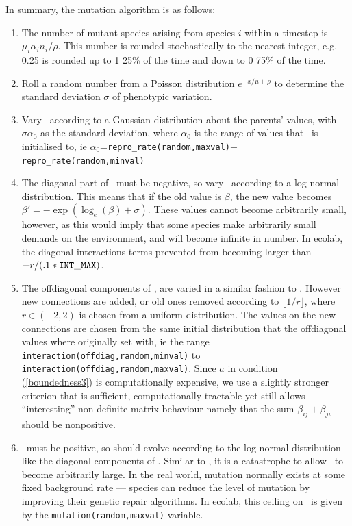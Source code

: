 In summary, the mutation algorithm is as follows:
\begin{enumerate}
\item The number of mutant species arising from species $i$ within a
timestep is $\mu_i\alpha_in_i/\rho$. This number is rounded
stochastically to the nearest integer, e.g. 0.25 is rounded up to 1
25\% of the time and down to 0 75\% of the time.

\item Roll a random number from a Poisson distribution
$e^{-x/\mu+\rho}$ to determine the standard deviation $\sigma$ of phenotypic
variation. 

\item Vary \br\ according to a Gaussian distribution about the
parents' values, with $\sigma\alpha_0$ as the standard deviation,
where $\alpha_0$ is the range of values that \br\ is initialised
to, ie $\alpha_0$=\verb|repro_rate(random,maxval)|$-$\verb|repro_rate(random,minval)|

\item The diagonal part of \bbeta\ must be negative, so vary \bbeta\
according to a log-normal distribution. This means that if the old
value is $\beta$, the new value becomes
$\beta'=-\exp(\log_e(\beta)+\sigma)$. These values cannot become
arbitrarily small, however, as this would imply that some species make
arbitrarily small demands on the environment, and will become infinite
in number. In ecolab, the diagonal interactions terms prevented from
becoming larger than $-r/(.1*{\tt INT\_MAX})$.

\item The offdiagonal components of \bbeta, are varied in a similar
fashion to \br. However new connections are added, or old ones
removed according to $\lfloor 1/r\rfloor$, where $r\in(-2,2)$ is
chosen from a uniform distribution. The values on the new connections
are chosen from the same initial distribution that the offdiagonal
values where originally set with, ie the range
\verb|interaction(offdiag,random,minval)| to
\verb|interaction(offdiag,random,maxval)|. Since $a$ in condition
(\ref{boundedness3}) is computationally expensive, we use a slightly stronger
criterion that is sufficient, computationally tractable yet still
allows ``interesting'' non-definite matrix behaviour namely that the sum
$\beta_{ij}+\beta_{ji}$ should be nonpositive.


\item \bmu\ must be positive, so should evolve according to the
log-normal distribution like the diagonal components of
\bbeta. Similar to \bbeta, it is a catastrophe to allow \bmu\ to
become arbitrarily large. In the real world, mutation normally exists
at some fixed background rate --- species can reduce the level of
mutation by improving their genetic repair algorithms. In ecolab, this
ceiling on \bmu\ is given by the \verb|mutation(random,maxval)| variable.

\end{enumerate}

